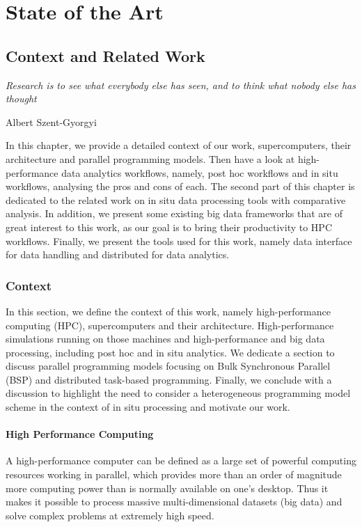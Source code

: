 \pagestyle{fancy}
\fancyhead{}
\fancyfoot{}
\fancyfoot[RO,LE]{\thepage}


\part{State of the Art}\label{part:state}


\chapter{Context and Related Work}\label{chap:context}
\vspace{20mm}
\epigraph{\textit{Research is to see what everybody else has seen, and to think what nobody else has thought}} {Albert Szent-Gyorgyi}

\vfill
In this chapter, we provide a detailed context of our work, 
supercomputers, their architecture and parallel programming models. 
Then have a look at high-performance data analytics workflows, namely, post hoc workflows and in situ workflows, analysing the pros and cons of each.
The second part of this chapter is dedicated to the related work on in situ data processing tools with comparative analysis. In addition, we present some existing big data frameworks that are of great interest to this work, as our goal is to bring their productivity to HPC workflows.
Finally, we present the tools used for this work, namely \pdi data interface for data handling and \dask distributed for data analytics. 

\newpage
\section{Context}

In this section, we define the context of this work, namely high-performance computing (HPC), supercomputers and their architecture. High-performance simulations running on those machines and high-performance and big data processing, including post hoc and in situ analytics. We dedicate a section to discuss parallel programming models focusing on Bulk Synchronous Parallel (BSP) and distributed task-based programming. Finally, we conclude with a discussion to highlight the need to consider a heterogeneous programming model scheme in the context of in situ processing and motivate our work.  

\subsection{High Performance Computing}
A high-performance computer can be defined as a large set of powerful computing resources working in parallel, which provides more than an order of magnitude more computing power than is normally available on one’s desktop. Thus it makes it possible to process massive multi-dimensional datasets (big data) and solve complex problems at extremely high speed\cite{JISC, ibm, hpc}. 

